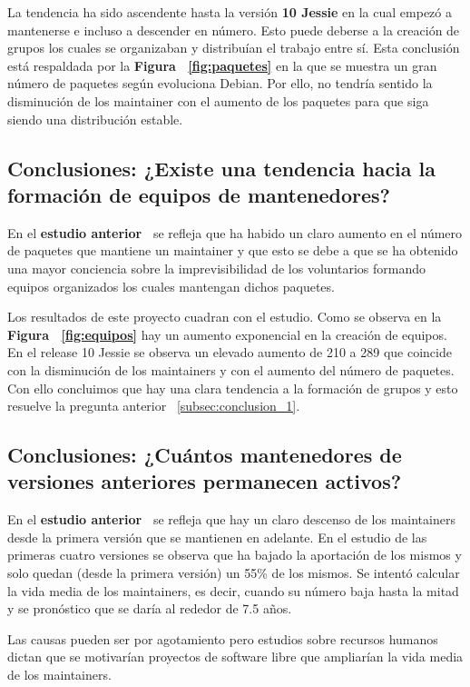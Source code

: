 \documentclass[a4paper, 12pt]{book}
\begin{document}
La tendencia ha sido ascendente hasta la versión \textbf{10 Jessie} en la cual empezó a mantenerse e incluso a descender en número. Esto puede deberse a la creación de grupos los cuales se organizaban y distribuían el trabajo entre sí. Esta conclusión está respaldada por la \textbf{Figura ~\ref{fig:paquetes}} en la que se muestra un gran número de paquetes según evoluciona Debian. Por ello, no tendría sentido la disminución de los maintainer con el aumento de los paquetes para que siga siendo una distribución estable. 

\subsection{Conclusiones: ¿Existe una tendencia hacia la formación de equipos de mantenedores?}
\label{subsec:conclusion_2}
En el \textbf{estudio anterior~\cite{robles05:_debian}} se refleja que ha habido un claro aumento en el número de paquetes que mantiene un maintainer y que esto se debe a que se ha obtenido una mayor conciencia sobre la imprevisibilidad de los voluntarios formando equipos organizados los cuales mantengan dichos paquetes.

Los resultados de este proyecto cuadran con el estudio. Como se observa en la \textbf{Figura ~\ref{fig:equipos}} hay un aumento exponencial en la creación de equipos. En el release 10 Jessie se observa un elevado aumento de 210 a 289 que coincide con la disminución de los maintainers y con el aumento del número de paquetes. Con ello concluimos que hay una clara tendencia a la formación de grupos y esto resuelve la pregunta anterior ~\ref{subsec:conclusion_1}.

\subsection{Conclusiones: ¿Cuántos mantenedores de versiones anteriores permanecen activos?}
\label{subsec:conclusion_3}
En el \textbf{estudio anterior~\cite{robles05:_debian}} se refleja que hay un claro descenso de los maintainers desde la primera versión que se mantienen en adelante. 
En el estudio de las primeras cuatro versiones se observa que ha bajado la aportación de los mismos y solo quedan (desde la primera versión) un 55\% de los mismos. Se intentó calcular la vida media de los maintainers, es decir, cuando su número baja hasta la mitad y se pronóstico que se daría al rededor de 7.5 años.

Las causas pueden ser por agotamiento pero estudios sobre recursos humanos dictan que se motivarían proyectos de software libre que ampliarían la vida media de los maintainers. 
\end{document}
